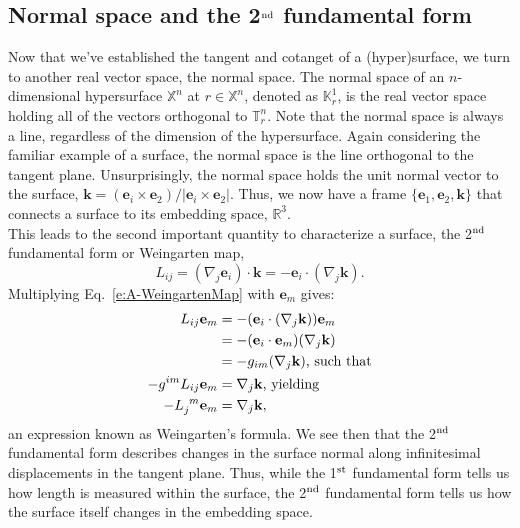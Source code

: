 \begin{appendices}
\section{Normal space and the 2$^{\rm nd}$ fundamental form}
Now that we've established the tangent and cotanget of a (hyper)surface, we turn to another real vector space, the normal space.
The normal space of an $n$-dimensional hypersurface $\mathbb{X}^n$ at $r\in \mathbb{X}^n$, denoted as $\mathbb{K}^1_r$, is the real vector space holding all of the vectors orthogonal to $\mathbb{T}^n_r$.
Note that the normal space is always a line, regardless of the dimension of the hypersurface.
Again considering the familiar example of a surface, the normal space is the line orthogonal to the tangent plane.
Unsurprisingly, the normal space holds the unit normal vector to the surface, $\mathbf{k} = (\mathbf{e}_i \times \mathbf{e}_2)/|\mathbf{e}_i \times \mathbf{e}_2|$.
Thus, we now have a frame $\{\mathbf{e}_1, \mathbf{e}_2, \mathbf{k}\}$ that connects a surface to its embedding space, $\mathbb{R}^3$. \\

This leads to the second important quantity to characterize a surface, the 2$^{\rm nd}$ fundamental form or Weingarten map,
\begin{equation}
  L_{ij} = (\nabla_j \mathbf{e}_i) \cdot \mathbf{k} = -\mathbf{e}_i \cdot (\nabla_j \mathbf{k}).\label{e:A-WeingartenMap}
\end{equation}
Multiplying Eq.~\ref{e:A-WeingartenMap} with $\mathbf{e}_m$ gives:
\begin{align}
  L_{ij}\mathbf{e}_m &= -(\mathbf{e}_i \cdot (\nabla_j \mathbf{k}))\mathbf{e}_m \nonumber \\
  &= -(\mathbf{e}_i \cdot \mathbf{e}_m)(\nabla_j \mathbf{k})\nonumber \\
  &= -g_{im}(\nabla_j \mathbf{k})\textrm{, such that} \nonumber \\
  -g^{im}L_{ij}\mathbf{e}_m &= \nabla_j \mathbf{k}\textrm{, yielding} \nonumber \\
  -\tensor{L}{_j^m}\mathbf{e}_m &= \nabla_j \mathbf{k},\label{e:A-WeingartenFormula}
\end{align}
an expression known as Weingarten's formula.
We see then that the 2$^{\rm nd}$ fundamental form describes changes in the surface normal along infinitesimal displacements in the tangent plane.
Thus, while the 1$^{\rm st}$ fundamental form tells us how length is measured within the surface, the 2$^{\rm nd}$ fundamental form tells us how the surface itself changes in the embedding space. \\


\end{appendices}
